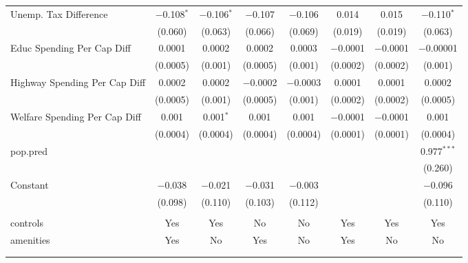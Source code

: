 \begin{table}[!htbp]
\begin{tabular}{@{\extracolsep{5pt}}lccccccc}
  Unemp. Tax Difference & $-$0.108$^{*}$ & $-$0.106$^{*}$ & $-$0.107 & $-$0.106 & 0.014 & 0.015 & $-$0.110$^{*}$ \\ 
  & (0.060) & (0.063) & (0.066) & (0.069) & (0.019) & (0.019) & (0.063) \\ 
  Educ Spending Per Cap Diff & 0.0001 & 0.0002 & 0.0002 & 0.0003 & $-$0.0001 & $-$0.0001 & $-$0.00001 \\ 
  & (0.0005) & (0.001) & (0.0005) & (0.001) & (0.0002) & (0.0002) & (0.001) \\ 
  Highway Spending Per Cap Diff & 0.0002 & 0.0002 & $-$0.0002 & $-$0.0003 & 0.0001 & 0.0001 & 0.0002 \\ 
  & (0.0005) & (0.001) & (0.0005) & (0.001) & (0.0002) & (0.0002) & (0.0005) \\ 
  Welfare Spending Per Cap Diff & 0.001 & 0.001$^{*}$ & 0.001 & 0.001 & $-$0.0001 & $-$0.0001 & 0.001 \\ 
  & (0.0004) & (0.0004) & (0.0004) & (0.0004) & (0.0001) & (0.0001) & (0.0004) \\ 
  pop.pred &  &  &  &  &  &  & 0.977$^{***}$ \\ 
  &  &  &  &  &  &  & (0.260) \\ 
  Constant & $-$0.038 & $-$0.021 & $-$0.031 & $-$0.003 &  &  & $-$0.096 \\ 
  & (0.098) & (0.110) & (0.103) & (0.112) &  &  & (0.110) \\ 
 \hline \\[-1.8ex] 
controls & Yes & Yes & No & No & Yes & Yes & Yes \\ 
amenities & Yes & No & Yes & No & Yes & No & No \\ 
\hline \\[-1.8ex] 
\hline 
\hline \\[-1.8ex] 
\end{tabular} 
\end{table} 
